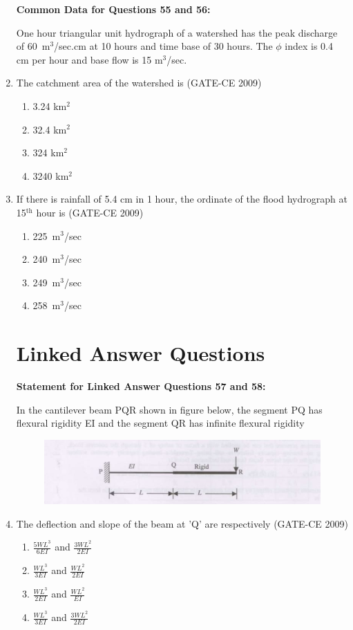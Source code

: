 \documentclass[journal,12pt,onecolumn]{article}
\theoremstyle{remark}
\begin{document}
\begin{enumerate}
\textbf{Common Data for Questions 55 and 56:}

One hour triangular unit hydrograph of a watershed has the peak discharge of 60~m$^3$/sec.cm at 10 hours and time base of 30 hours. The $\phi$ index is 0.4 cm per hour and base flow is 15 m$^3$/sec.

    \item The catchment area of the watershed is (GATE-CE 2009)
    \begin{enumerate}
        \item 3.24 km$^2$ 
        \item 32.4 km$^2$ 
        \item 324 km$^2$ 
        \item 3240 km$^2$
    \end{enumerate}
    
    \item If there is rainfall of 5.4 cm in 1 hour, the ordinate of the flood hydrograph at 15$^\text{th}$ hour is (GATE-CE 2009)
    \begin{enumerate}
        \item 225~m$^3$/sec 
        \item 240~m$^3$/sec 
        \item 249~m$^3$/sec 
        \item 258~m$^3$/sec
    \end{enumerate}

\section*{Linked Answer Questions}
\textbf{Statement for Linked Answer Questions 57 and 58:}

In the cantilever beam PQR shown in figure below, the segment PQ has flexural rigidity EI and the segment QR has infinite flexural rigidity
    \begin{figure}[H]
    \centering
    \includegraphics[width=0.7\columnwidth]{figs/image6.jpg}
    \label{fig:placeholder}
    \end{figure}
    
    \item The deflection and slope of the beam at 'Q' are respectively (GATE-CE 2009)
    \begin{enumerate}
        \item $\frac{5WL^3}{6EI}$ and $\frac{3WL^2}{2EI}$ 
        \item $\frac{WL^3}{3EI}$ and $\frac{WL^2}{2EI}$ 
        \item $\frac{WL^3}{2EI}$ and $\frac{WL^2}{EI}$ 
        \item $\frac{WL^3}{3EI}$ and $\frac{3WL^2}{2EI}$
    \end{enumerate}
    

\end{enumerate}
\end{document}
